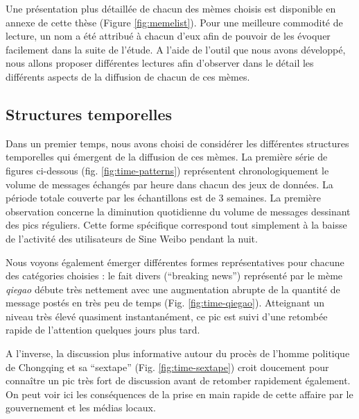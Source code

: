 \label{sec:fullmemes}

Une présentation plus détaillée de chacun des mèmes choisis est disponible en annexe de cette thèse (Figure \ref{fig:memelist}). Pour une meilleure commodité de lecture, un nom a été attribué \`a chacun d'eux afin de pouvoir de les évoquer facilement dans la suite de l'étude. A l'aide de l'outil que nous avons développé, nous allons proposer différentes lectures afin d'observer dans le détail les différents aspects de la diffusion de chacun de ces mèmes. 


\subsection[Structures temporelles]{Structures temporelles}

Dans un premier temps, nous avons choisi de considérer les différentes structures temporelles qui émergent de la diffusion de ces mèmes. La première série de figures ci-dessous (fig. \ref{fig:time-patterns}) représentent chronologiquement le volume de messages échangés par heure dans chacun des jeux de données. La période totale couverte par les échantillons est de 3 semaines. La première observation concerne la diminution quotidienne du volume de messages dessinant des pics réguliers. Cette forme spécifique correspond tout simplement \`a la baisse de l{\textquoteright}activité des utilisateurs de Sine Weibo pendant la nuit.

Nous voyons également émerger différentes formes représentatives pour chacune des catégories choisies : le fait divers ({\textquotedblleft}breaking news{\textquotedblright}) représenté par le mème \textit{qiegao} débute très nettement avec une augmentation abrupte de la quantité de message postés en très peu de temps (Fig. \ref{fig:time-qiegao}). Atteignant un niveau très élevé quasiment instantanément, ce pic est suivi d{\textquoteright}une retombée rapide de l{\textquoteright}attention quelques jours plus tard.  

A l'inverse, la discussion plus informative autour du procès de l{\textquoteright}homme politique de Chongqing et sa {\textquotedblleft}sextape{\textquotedblright} (Fig. \ref{fig:time-sextape}) croit doucement pour conna\^itre un pic très fort de discussion avant de retomber rapidement également. On peut voir ici les conséquences de la prise en main rapide de cette affaire par le gouvernement et les médias locaux. 


